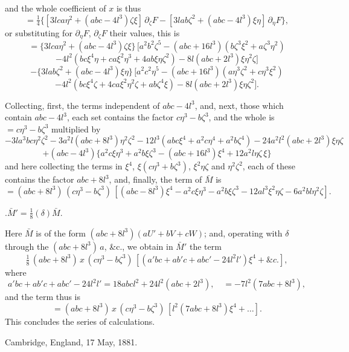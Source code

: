 \documentclass[11pt,a4paper]{article}
\begin{document}
and the whole coefficient of $x$ is thus
\[
  =\tfrac{1}{4}\{[3lca\eta^{2}+(abc-4l^{3})\zeta\xi]\,\partial_{\zeta}F-[3lab\zeta^{2}+(abc-4l^{3})\xi\eta]\,\partial_{\eta}F\},
\]
or substituting for $\partial_{\eta}F$, $\partial_{\zeta}F$ their values, this is
\[
  =\{3lca\eta^{2}+(abc-4l^{3})\zeta\xi\}\,[a^{2}b^{2}\zeta^{5}-(abc+16l^{3})(b\zeta^{3}\xi^{2}+a\zeta^{3}\eta^{2})
\]
\[
  -4l^{2}(bc\xi^{4}\eta+ca\xi^{2}\eta^{3}+4ab\xi\eta\zeta^{2})-8l(abc+2l^{3})\xi\eta^{2}\zeta]
\]
\[
  -\{3lab\zeta^{2}+(abc-4l^{3})\xi\eta\}\,[a^{2}c^{2}\eta^{5}-(abc+16l^{3})(a\eta^{3}\zeta^{2}+c\eta^{3}\xi^{2})
\]
\[
  -4l^{2}(bc\xi^{4}\zeta+4ca\xi^{2}\eta^{2}\zeta+ab\zeta^{4}\xi)-8l(abc+2l^{3})\xi\eta\zeta^{2}].
\]

\newpage
\noindent
Collecting, first, the terms independent of $abc-4l^{3}$, and, next, those which contain $abc-4l^{3}$, each set contains the factor $c\eta^{3}-b\zeta^{3}$, and the whole is $=c\eta^{3}-b\zeta^{3}$ multiplied by
\[
  -3la^{3}bc\eta^{2}\zeta^{2}-3a^{2}l(abc+8l^{3})\eta^{2}\zeta^{2}-12l^{3}(abc\xi^{4}+a^{2}c\eta^{4}+a^{2}b\zeta^{4})-24a^{2}l^{2}(abc+2l^{3})\xi\eta\zeta
\]
\[
  +(abc-4l^{3})\{a^{2}c\xi\eta^{3}+a^{2}b\xi\zeta^{3}-(abc+16l^{3})\xi^{4}+12a^{2}l\eta\zeta\,\xi\}
\]
and here collecting the terms in $\xi^{4}$, $\xi(c\eta^{3}+b\zeta^{3})$, $\xi^{2}\eta\zeta$ and $\eta^{2}\zeta^{2}$, each of these contains the factor $abc+8l^{3}$, and, finally, the term of $\bar M$ is
\[
  =(abc+8l^{3})\,(c\eta^{3}-b\zeta^{3})\,[(abc-8l^{3})\xi^{4}-a^{2}c\xi\eta^{3}-a^{2}b\xi\zeta^{3}-12al^{3}\xi^{2}\eta\zeta-6a^{2}bl\eta^{2}\zeta].
\]

\medskip{}.\quad $\bar M'=\tfrac{1}{8}(\delta)\bar M.$

Here $\bar M$ is of the form $(abc+8l^{3})(aU'+bV+cW)$; and, operating with $\delta$ through the $(abc+8l^{3})\,a$, \&c., we obtain in $\bar M'$ the term
\[
  \tfrac{1}{8}\,(abc+8l^{3})\,x\,(c\eta^{3}-b\zeta^{3})\,[(a'bc+ab'c+abc'-24l^{2}l')\xi^{4}+\&c.],
\]
where
\[
  a'bc+ab'c+abc'-24l^{2}l'=18abcl^{2}+24l^{2}(abc+2l^{3}),\quad =-7l^{2}(7abc+8l^{3}),
\]
and the term thus is
\[
  =(abc+8l^{3})\,x\,(c\eta^{3}-b\zeta^{3})\,[l^{2}(7abc+8l^{3})\xi^{4}+\ldots].
\]
This concludes the series of calculations.

\bigskip

\noindent Cambridge, England, 17 May, 1881.

\bigskip

\end{document}
